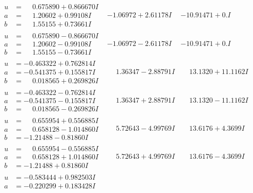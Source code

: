 \documentclass[1p]{elsarticle_modified}
\theoremstyle{definition}
\begin{document}
$$\begin{array}{c|c|c}
\begin{aligned}
u &= \phantom{-}0.675890 + 0.866670 I \\
a &= \phantom{-}1.20602 + 0.99108 I \\
b &= \phantom{-}1.55155 + 0.73661 I\end{aligned}
 & -1.06972 + 2.61178 I & -10.91471 + 0. I\phantom{ +0.000000I} \\ \hline\begin{aligned}
u &= \phantom{-}0.675890 - 0.866670 I \\
a &= \phantom{-}1.20602 - 0.99108 I \\
b &= \phantom{-}1.55155 - 0.73661 I\end{aligned}
 & -1.06972 - 2.61178 I & -10.91471 + 0. I\phantom{ +0.000000I} \\ \hline\begin{aligned}
u &= -0.463322 + 0.762814 I \\
a &= -0.541375 + 0.155817 I \\
b &= \phantom{-}0.018565 + 0.269826 I\end{aligned}
 & \phantom{-}1.36347 - 2.88791 I & \phantom{-}13.1320 + 11.1162 I \\ \hline\begin{aligned}
u &= -0.463322 - 0.762814 I \\
a &= -0.541375 - 0.155817 I \\
b &= \phantom{-}0.018565 - 0.269826 I\end{aligned}
 & \phantom{-}1.36347 + 2.88791 I & \phantom{-}13.1320 - 11.1162 I \\ \hline\begin{aligned}
u &= \phantom{-}0.655954 + 0.556885 I \\
a &= \phantom{-}0.658128 - 1.014860 I \\
b &= -1.21488 - 0.81860 I\end{aligned}
 & \phantom{-}5.72643 - 4.99769 I & \phantom{-}13.6176 + 4.3699 I \\ \hline\begin{aligned}
u &= \phantom{-}0.655954 - 0.556885 I \\
a &= \phantom{-}0.658128 + 1.014860 I \\
b &= -1.21488 + 0.81860 I\end{aligned}
 & \phantom{-}5.72643 + 4.99769 I & \phantom{-}13.6176 - 4.3699 I \\ \hline\begin{aligned}
u &= -0.583444 + 0.982503 I \\
a &= -0.220299 + 0.183428 I \\

\end{aligned}
\end{array}$$
\end{document}
